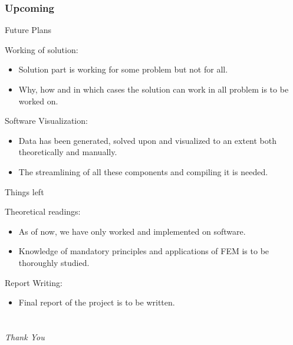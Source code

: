 \documentclass{beamer}
\begin{document}
\section{Upcoming}
\begin{frame}{Future Plans}
	
	Working of solution:
	\begin{itemize}
		\item Solution part is working for some problem but not for all.
		\item Why, how and in which cases the solution can work in all problem is to be worked on.
		
	\end{itemize}
	
	Software Visualization:
	\begin{itemize}
		\item Data has been generated, solved upon and visualized to an extent both theoretically and manually.
		\item The streamlining of all these components and compiling it is needed.
		
	\end{itemize}
	
\end{frame}


\begin{frame}{Things left}
	
	Theoretical readings:
	\begin{itemize}
		\item As of now, we have only worked and implemented on software.
		\item Knowledge of mandatory principles and applications of FEM is to be thoroughly studied.
		
	\end{itemize}
	
	Report Writing:
	\begin{itemize}
		\item Final report of the project is to be written.
		
		
	\end{itemize}
	
\end{frame}

\part{}
\begin{frame}
	\centering \Large
	\emph{Thank You}
\end{frame}
\end{document}
